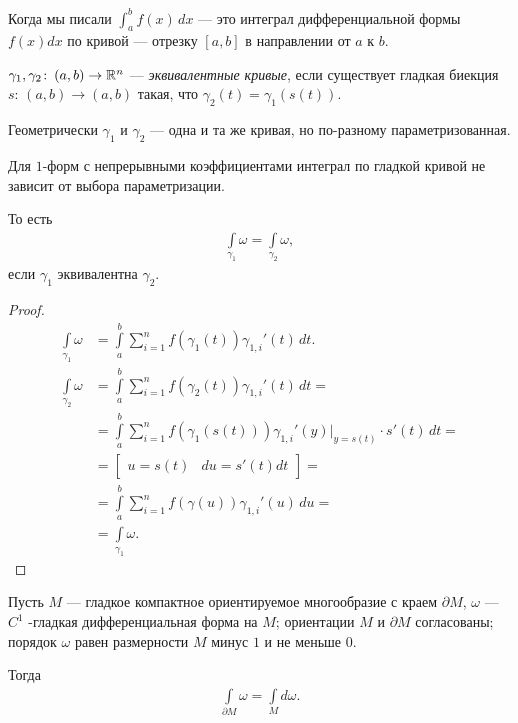 Когда мы писали $\int_{a}^{b} f(x) \, dx $ --- это интеграл дифференциальной формы $f(x) dx$  по кривой --- отрезку $[a,b]$ в направлении от $a$ к $b$.

\begin{df}
 $\gamma_1, \gamma_2 \colon\, (a, b) \to \mathbb{R}^{n}$ --- \textit{эквивалентные кривые}, если существует гладкая биекция $s \colon\, (a,b) \to (a,b) $  такая, что $\gamma_2(t) = \gamma_1(s(t))$.
\end{df}

\begin{remrk*}
 Геометрически $\gamma_1$ и $\gamma_2$ --- одна и та же кривая, но по-разному параметризованная.
\end{remrk*}
\begin{claim}
 Для $1$-форм с непрерывными коэффициентами интеграл по гладкой кривой не зависит от выбора параметризации.  

 То есть
 \begin{align*}
  \int\limits_{\gamma_1} \omega = \int\limits_{\gamma_2} \omega
 ,\end{align*} если $\gamma_1$ эквивалентна $\gamma_2$.
\end{claim}
\begin{proof}
 \begin{align*}
  \int\limits_{\gamma_1} \omega &= \int\limits_{a}^{b} \sum_{i=1}^{n} f(\gamma_1(t))\gamma_{1,i}'(t) \, dt. \\
  \int\limits_{\gamma_2} \omega &= \int\limits_{a}^{b} \sum_{i=1}^{n} f(\gamma_2(t))\gamma_{1,i}'(t) \, dt =  \\
  &= \int\limits_{a}^{b} \sum_{i=1}^{n} f(\gamma_1(s(t))) \gamma_{1,i}'(y) \rvert_{y = s(t)} \cdot s'(t) \, dt = \\
  &= \begin{bmatrix}
   u = s(t) & du = s'(t) dt
  \end{bmatrix} = \\
  &= \int\limits_{a}^{b} \sum_{i=1}^{n} f(\gamma(u)) \gamma_{1,i}'(u) \, du = \\
  &= \int\limits_{\gamma_1} \omega
 .\end{align*}
\end{proof}
\begin{thm}[%
Стокса]
\label{theorem:stox}
 Пусть $M$  --- гладкое компактное ориентируемое многообразие с краем $\partial M$,  $\omega$  --- $C^{1}$ -гладкая дифференциальная форма на $M$; ориентации $M$  и $\partial M$  согласованы; порядок $\omega$ равен размерности $M$  минус $1$ и не меньше $0$.

 Тогда
 \begin{align}
  \label{equation:formula_stox}
  \int\limits_{\partial M} \omega = \int\limits_{M} d \omega
 .\end{align} 
\end{thm}

